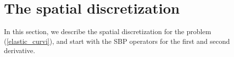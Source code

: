 \section{The spatial discretization}

In this section, we describe the spatial discretization for the problem (\ref{elastic_curvi}), and start with the SBP operators for the first and second derivative.